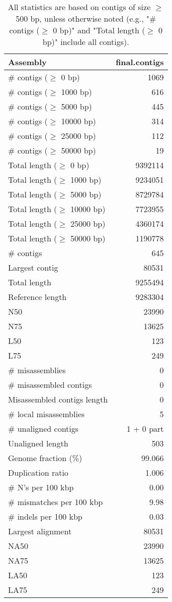 \documentclass[12pt,a4paper]{article}
\begin{document}
\begin{table}[ht]
\begin{center}
\caption{All statistics are based on contigs of size $\geq$ 500 bp, unless otherwise noted (e.g., "\# contigs ($\geq$ 0 bp)" and "Total length ($\geq$ 0 bp)" include all contigs).}
\begin{tabular}{|l*{1}{|r}|}
\hline
Assembly & final.contigs \\ \hline
\# contigs ($\geq$ 0 bp) & 1069 \\ \hline
\# contigs ($\geq$ 1000 bp) & 616 \\ \hline
\# contigs ($\geq$ 5000 bp) & 445 \\ \hline
\# contigs ($\geq$ 10000 bp) & 314 \\ \hline
\# contigs ($\geq$ 25000 bp) & 112 \\ \hline
\# contigs ($\geq$ 50000 bp) & 19 \\ \hline
Total length ($\geq$ 0 bp) & 9392114 \\ \hline
Total length ($\geq$ 1000 bp) & 9234051 \\ \hline
Total length ($\geq$ 5000 bp) & 8729784 \\ \hline
Total length ($\geq$ 10000 bp) & 7723955 \\ \hline
Total length ($\geq$ 25000 bp) & 4360174 \\ \hline
Total length ($\geq$ 50000 bp) & 1190778 \\ \hline
\# contigs & 645 \\ \hline
Largest contig & 80531 \\ \hline
Total length & 9255494 \\ \hline
Reference length & 9283304 \\ \hline
N50 & 23990 \\ \hline
N75 & 13625 \\ \hline
L50 & 123 \\ \hline
L75 & 249 \\ \hline
\# misassemblies & 0 \\ \hline
\# misassembled contigs & 0 \\ \hline
Misassembled contigs length & 0 \\ \hline
\# local misassemblies & 5 \\ \hline
\# unaligned contigs & 1 + 0 part \\ \hline
Unaligned length & 503 \\ \hline
Genome fraction (\%) & 99.066 \\ \hline
Duplication ratio & 1.006 \\ \hline
\# N's per 100 kbp & 0.00 \\ \hline
\# mismatches per 100 kbp & 9.98 \\ \hline
\# indels per 100 kbp & 0.03 \\ \hline
Largest alignment & 80531 \\ \hline
NA50 & 23990 \\ \hline
NA75 & 13625 \\ \hline
LA50 & 123 \\ \hline
LA75 & 249 \\ \hline
\end{tabular}
\end{center}
\end{table}
\end{document}
